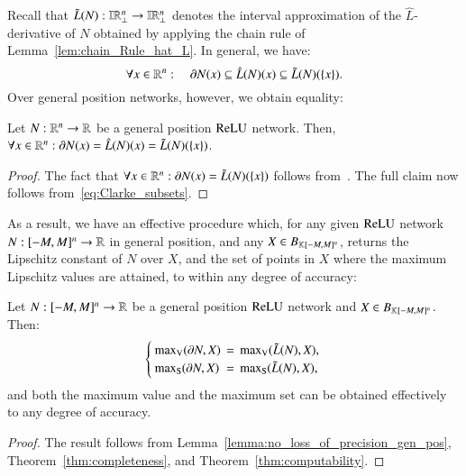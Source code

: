 \documentclass[11pt,times]{article}
\begin{document}
Recall that
$\tilde{L}(N): \intvaldom[\R^n\lift] \to \intvaldom[\R^n\lift]$
denotes the interval approximation of the $\hat{L}$-derivative of $N$
obtained by applying the chain rule of
Lemma~\ref{lem:chain_Rule_hat_L}. In general, we have:
  \begin{equation}
    \label{eq:Clarke_subsets}
    \forall x \in \R^n:  \quad \clarke{N}(x) \subseteq \hat{L}(N)(x) \subseteq
    \tilde{L}(N)(\set{x}). 
  \end{equation}
  \noindent
  Over general position networks, however, we obtain equality:  
%
\begin{lemma}
  \label{lemma:no_loss_of_precision_gen_pos}
  Let $N : \R^n \to \R$ be a general position $\ReLU$
  network. Then, $\forall x \in \R^n: \clarke{N}(x) = \hat{L}(N)(x) =
  \tilde{L}(N)(\set{x})$.
\end{lemma}
%
\begin{proof}  
  The fact that
  $\forall x \in \R^n:\clarke{N}(x) = \tilde{L}(N)(\set{x})$
  follows
  from~\parencite[Theorem~2]{Jordan_Dimakis:Exactly_NeurIPS:2020}. The
  full claim now follows from~\eqref{eq:Clarke_subsets}.
\end{proof}

   As a result, we have an effective procedure which, for any given
   $\ReLU$ network $N : [-M,M]^n \to \R$ in general position, and any
   $X \in B_{\kCPPO{[-M,M]^n}}$, returns the Lipschitz constant of $N$
   over $X$, and the set of points in $X$ where the maximum Lipschitz
   values are attained, to within any degree of accuracy:

\begin{theorem}
  \label{thm:gen_pos_ReLU}
  Let $N : [-M,M]^n \to \R$ be a general position $\ReLU$ network and
  $X \in B_{\kCPPO{[-M,M]^n}}$. Then:
  \begin{equation*}
    \left\{
      \arrayoptions{0.5ex}{1.2}
      \begin{array}{lcl}
        \maxV(\clarke{N},X) &= &\maxV(\tilde{L}(N), X),\\
        \maxS(\clarke{N},X) &= &\maxS(\tilde{L}(N), X),
      \end{array}
    \right.
  \end{equation*}
  \noindent
  and both the maximum value and the maximum set can be obtained
  effectively to any degree of accuracy.
\end{theorem}

\begin{proof}
  The result follows from
  Lemma~\ref{lemma:no_loss_of_precision_gen_pos},
  Theorem~\ref{thm:completeness}, and Theorem~\ref{thm:computability}.
\end{proof}
\end{document}
